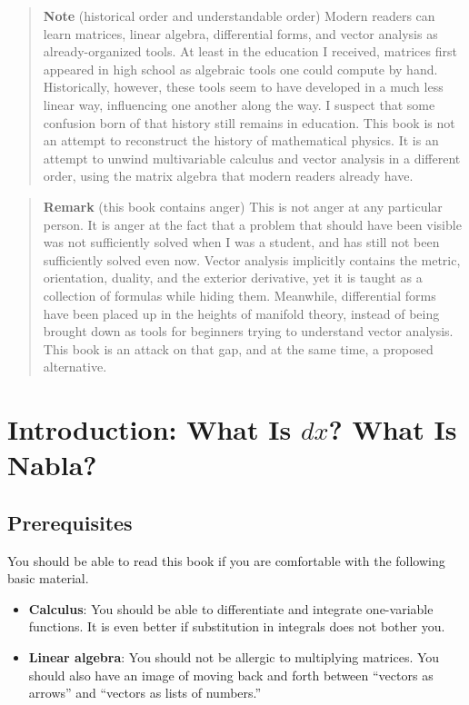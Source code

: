 \begin{quote}
\textbf{Note} (historical order and understandable order) Modern readers
can learn matrices, linear algebra, differential forms, and vector
analysis as already-organized tools. At least in the education I
received, matrices first appeared in high school as algebraic tools one
could compute by hand. Historically, however, these tools seem to have
developed in a much less linear way, influencing one another along the
way. I suspect that some confusion born of that history still remains in
education. This book is not an attempt to reconstruct the history of
mathematical physics. It is an attempt to unwind multivariable calculus
and vector analysis in a different order, using the matrix algebra that
modern readers already have.
\end{quote}

\begin{quote}
\textbf{Remark} (this book contains anger) This is not anger at any
particular person. It is anger at the fact that a problem that should
have been visible was not sufficiently solved when I was a student, and
has still not been sufficiently solved even now. Vector analysis
implicitly contains the metric, orientation, duality, and the exterior
derivative, yet it is taught as a collection of formulas while hiding
them. Meanwhile, differential forms have been placed up in the heights
of manifold theory, instead of being brought down as tools for beginners
trying to understand vector analysis. This book is an attack on that
gap, and at the same time, a proposed alternative.
\end{quote}

\newpage

\hypertarget{introduction-what-is-dx-what-is-nabla}{%
\chapter{\texorpdfstring{Introduction: What Is \(dx\)? What Is
Nabla?}{Introduction: What Is dx? What Is Nabla?}}\label{introduction-what-is-dx-what-is-nabla}}

\hypertarget{prerequisites}{%
\section{Prerequisites}\label{prerequisites}}

You should be able to read this book if you are comfortable with the
following basic material.

\begin{itemize}
\item
  \textbf{Calculus}: You should be able to differentiate and integrate
  one-variable functions. It is even better if substitution in integrals
  does not bother you.
\item
  \textbf{Linear algebra}: You should not be allergic to multiplying
  matrices. You should also have an image of moving back and forth
  between ``vectors as arrows'' and ``vectors as lists of numbers.''
\end{itemize}

